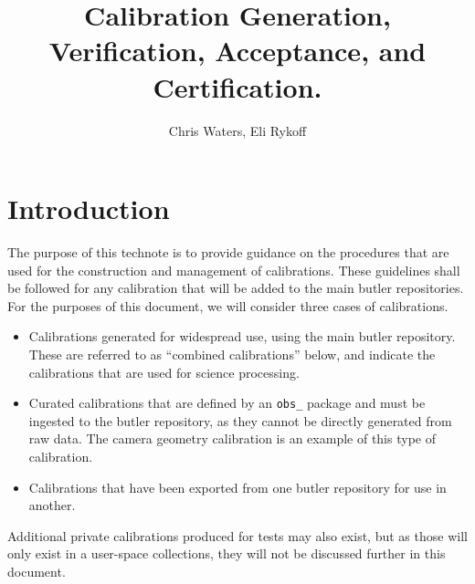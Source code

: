 \documentclass[DM,authoryear,toc]{lsstdoc}
\title{Calibration Generation, Verification, Acceptance, and Certification.}
\author{%
Chris Waters, Eli Rykoff
}
\date{\vcsDate}
\begin{document}
\maketitle


\section{Introduction}

The purpose of this technote is to provide guidance on the procedures that are used for the construction and management of calibrations.
These guidelines shall be followed for any calibration that will be added to the main butler repositories.  For the purposes of this document, we will consider three cases of calibrations.

\begin{itemize}
\item Calibrations generated for widespread use, using the main butler repository.  These are referred to as ``combined calibrations'' below, and indicate the calibrations that are used for science processing.
\item Curated calibrations that are defined by an \verb|obs_| package and must be ingested to the butler repository, as they cannot be directly generated from raw data.  The camera geometry calibration is an example of this type of calibration.
\item Calibrations that have been exported from one butler repository for use in another.
\end{itemize}

Additional private calibrations produced for tests may also exist, but as those will only exist in a user-space collections, they will not be discussed further in this document.
\end{document}
